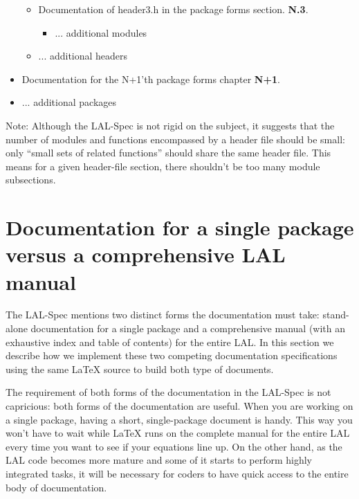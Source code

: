 \documentclass[oneside]{book}
\begin{document}
\begin{itemize}
\begin{itemize}
        \item Documentation of header3.h in the package forms section.
             {\large \bf N.3}.
             \begin{itemize} 
                 \vspace*{-0.051in}
                 \item ... additional modules
             \end{itemize} 
        \vspace*{-0.051in}
        \item ... additional headers
    \end{itemize} 
    \vspace*{-0.1in}
    \item Documentation for the N+1'th package forms chapter {\large \bf N+1}. 
    \item ... additional packages
\end{itemize}

Note: Although the LAL-Spec is not rigid on the subject, it suggests
that the number of modules and functions encompassed by a header file
should be small:  only ``small sets of related functions'' should
share the same header file. This means for a given header-file
section, there shouldn't be too many module subsections.


\section{Documentation for a single package versus a comprehensive LAL manual}

The LAL-Spec mentions two distinct forms the documentation must take:
stand-alone documentation for a single package and  a comprehensive
manual (with an exhaustive index and table of contents) for the entire
LAL.  In this section we describe how we implement these two competing
documentation specifications using the same {\LaTeX} source to build
both type of documents.

The requirement of both forms of the documentation in the LAL-Spec is
not capricious: both forms of the documentation are useful. When you
are working on a single package, having a short, single-package
document is handy.  This way you won't have to wait while {\LaTeX} runs
on the complete manual for the entire LAL every time you want to see
if your equations line up. On the other hand, as the LAL code becomes
more mature and some of it starts to perform highly integrated tasks,
it will be necessary for coders to have quick access to the entire
body of documentation.
\end{document}
